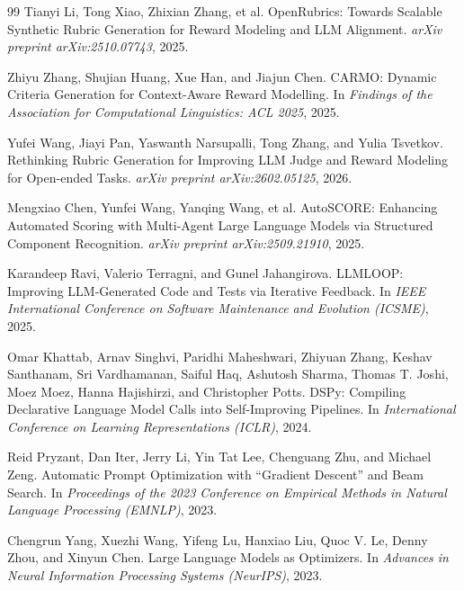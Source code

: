 \documentclass[11pt]{article}
\begin{document}
\begin{thebibliography}{99}
Tianyi Li, Tong Xiao, Zhixian Zhang, et al.
\newblock OpenRubrics: Towards Scalable Synthetic Rubric Generation for Reward Modeling and LLM Alignment.
\newblock \emph{arXiv preprint arXiv:2510.07743}, 2025.

Zhiyu Zhang, Shujian Huang, Xue Han, and Jiajun Chen.
\newblock CARMO: Dynamic Criteria Generation for Context-Aware Reward Modelling.
\newblock In \emph{Findings of the Association for Computational Linguistics: ACL 2025}, 2025.

Yufei Wang, Jiayi Pan, Yaswanth Narsupalli, Tong Zhang, and Yulia Tsvetkov.
\newblock Rethinking Rubric Generation for Improving LLM Judge and Reward Modeling for Open-ended Tasks.
\newblock \emph{arXiv preprint arXiv:2602.05125}, 2026.

Mengxiao Chen, Yunfei Wang, Yanqing Wang, et al.
\newblock AutoSCORE: Enhancing Automated Scoring with Multi-Agent Large Language Models via Structured Component Recognition.
\newblock \emph{arXiv preprint arXiv:2509.21910}, 2025.

Karandeep Ravi, Valerio Terragni, and Gunel Jahangirova.
\newblock LLMLOOP: Improving LLM-Generated Code and Tests via Iterative Feedback.
\newblock In \emph{IEEE International Conference on Software Maintenance and Evolution (ICSME)}, 2025.

Omar Khattab, Arnav Singhvi, Paridhi Maheshwari, Zhiyuan Zhang, Keshav Santhanam, Sri Vardhamanan, Saiful Haq, Ashutosh Sharma, Thomas T. Joshi, Moez Moez, Hanna Hajishirzi, and Christopher Potts.
\newblock DSPy: Compiling Declarative Language Model Calls into Self-Improving Pipelines.
\newblock In \emph{International Conference on Learning Representations (ICLR)}, 2024.

Reid Pryzant, Dan Iter, Jerry Li, Yin Tat Lee, Chenguang Zhu, and Michael Zeng.
\newblock Automatic Prompt Optimization with ``Gradient Descent'' and Beam Search.
\newblock In \emph{Proceedings of the 2023 Conference on Empirical Methods in Natural Language Processing (EMNLP)}, 2023.

Chengrun Yang, Xuezhi Wang, Yifeng Lu, Hanxiao Liu, Quoc V. Le, Denny Zhou, and Xinyun Chen.
\newblock Large Language Models as Optimizers.
\newblock In \emph{Advances in Neural Information Processing Systems (NeurIPS)}, 2023.


\end{thebibliography}
\end{document}
